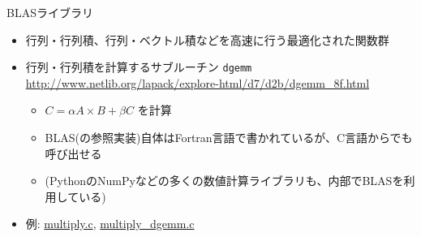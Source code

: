 \begin{frame}[t,fragile]{BLASライブラリ}
  \begin{itemize}
  \item 行列・行列積、行列・ベクトル積などを高速に行う最適化された関数群
  \item 行列・行列積を計算するサブルーチン {\tt dgemm} \\
    \url{http://www.netlib.org/lapack/explore-html/d7/d2b/dgemm_8f.html}
    \begin{itemize}
    \item $C = \alpha A \times B + \beta C$ を計算
    \item BLAS(の参照実装)自体はFortran言語で書かれているが、C言語からでも呼び出せる
    \item (PythonのNumPyなどの多くの数値計算ライブラリも、内部でBLASを利用している)
    \end{itemize}
  \item 例: \href{https://github.com/todo-group/computer-experiments/blob/master/exercise/matrix/multiply.c}{multiply.c}, \href{https://github.com/todo-group/computer-experiments/blob/master/exercise/matrix/multiply_dgemm.c}{multiply\_dgemm.c}
  \end{itemize}
\end{frame}
